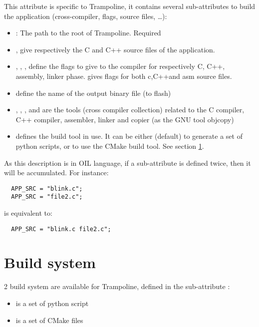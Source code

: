 
This attribute is specific to Trampoline, it contains several sub-attributes to build the application (cross-compiler, flags, source files, …):
\begin{itemize}
	\item {}: The path to the root of Trampoline. Required
	\item {},  give respectively the C and C++ source files of the application.
	\item {}, , ,  define the flags to give to the compiler for respectively C, C++, assembly, linker phase.  gives flags for both c,C++and asm source files.
	\item {} define the name of the output binary file (to flash)
	\item {}, , ,  and  are the tools (cross compiler collection) related to the C compiler, C++ compiler, assembler, linker and copier (as the GNU tool objcopy)
	\item {} defines the build tool in use. It can be either  (default) to generate a set of python scripts, or  to use the CMake build tool. See section \ref{sec:buildsystem}.
\end{itemize}

As this description is in OIL language, if a sub-attribute is defined twice, then it will be accumulated. For instance:
\lstset{language=OIL}
\begin{lstlisting}
  APP_SRC = "blink.c";
  APP_SRC = "file2.c";
\end{lstlisting}
is equivalent to:
\begin{lstlisting}
  APP_SRC = "blink.c file2.c";
\end{lstlisting}

\section{Build system}
\label{sec:buildsystem}
2 build system are available for Trampoline, defined in the sub-attribute :
\begin{itemize}
	\item {} is a set of python script
	\item {} is a set of CMake files 
\end{itemize}

